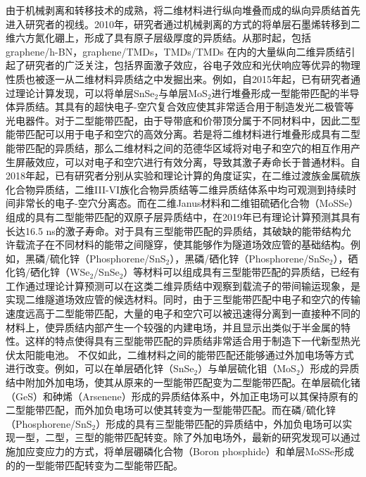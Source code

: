     由于机械剥离和转移技术的成熟，将二维材料进行纵向堆叠而成的纵向异质结首先进入研究者的视线。2010年，研究者通过机械剥离的方式的将单层石墨烯转移到二维六方氮化硼上，形成了具有原子层级厚度的异质结。从那时起，包括 graphene/h-BN，graphene/TMDs，TMDs/TMDs 在内的大量纵向二维异质结引起了研究者的广泛关注，包括界面激子效应，谷电子效应和光伏响应等优异的物理性质也被逐一从二维材料异质结之中发掘出来。例如，自2015年起，已有研究者通过理论计算发现，可以将单层SnSe$_2$与单层MoS$_2$进行堆叠形成一型能带匹配的半导体异质结。其具有的超快电子-空穴复合效应使其非常适合用于制造发光二极管等光电器件。对于二型能带匹配，由于导带底和价带顶分属于不同材料中，因此二型能带匹配可以用于电子和空穴的高效分离。若是将二维材料进行堆叠形成具有二型能带匹配的异质结，那么二维材料之间的范德华区域将对电子和空穴的相互作用产生屏蔽效应，可以对电子和空穴进行有效分离，导致其激子寿命长于普通材料。自2018年起，已有研究者分别从实验和理论计算的角度证实，在二维过渡族金属硫族化合物异质结，二维III-VI族化合物异质结等二维异质结体系中均可观测到持续时间非常长的电子-空穴分离态。而在二维Janus材料和二维钼硫硒化合物（MoSSe）组成的具有二型能带匹配的双原子层异质结中，在2019年已有理论计算预测其具有长达16.5 ns的激子寿命。对于具有三型能带匹配的异质结，其破缺的能带结构允许载流子在不同材料的能带之间隧穿，使其能够作为隧道场效应管的基础结构。例如，黑磷/硫化锌（Phosphorene/SnS$_2$），黑磷/硒化锌（Phosphorene/SnSe$_2$），硒化钨/硒化锌（WSe$_2$/SnSe$_2$）等材料可以组成具有三型能带匹配的异质结，已经有工作通过理论计算预测可以在这类二维异质结中观察到载流子的带间输运现象，是实现二维隧道场效应管的候选材料。同时，由于三型能带匹配中电子和空穴的传输速度远高于二型能带匹配，大量的电子和空穴可以被迅速得分离到一直接种不同的材料上，使异质结内部产生一个较强的内建电场，并且显示出类似于半金属的特性。这样的特点使得具有三型能带匹配的异质结非常适合用于制造下一代新型热光伏太阳能电池。
    不仅如此，二维材料之间的能带匹配还能够通过外加电场等方式进行改变。例如，可以在单层硒化锌（SnSe$_2$）与单层硫化钼（MoS$_2$）形成的异质结中附加外加电场，使其从原来的一型能带匹配变为二型能带匹配。在单层硫化锗（GeS）和砷烯（Arsenene）形成的异质结体系中，外加正电场可以其保持原有的二型能带匹配，而外加负电场可以使其转变为一型能带匹配。而在磷/硫化锌（Phosphorene/SnS$_2$）形成的具有三型能带匹配的异质结中，外加负电场可以实现一型，二型，三型的能带匹配转变。除了外加电场外，最新的研究发现可以通过施加应变应力的方式，将单层硼磷化合物（Boron phosphide）和单层MoSSe形成的的一型能带匹配转变为二型能带匹配。


